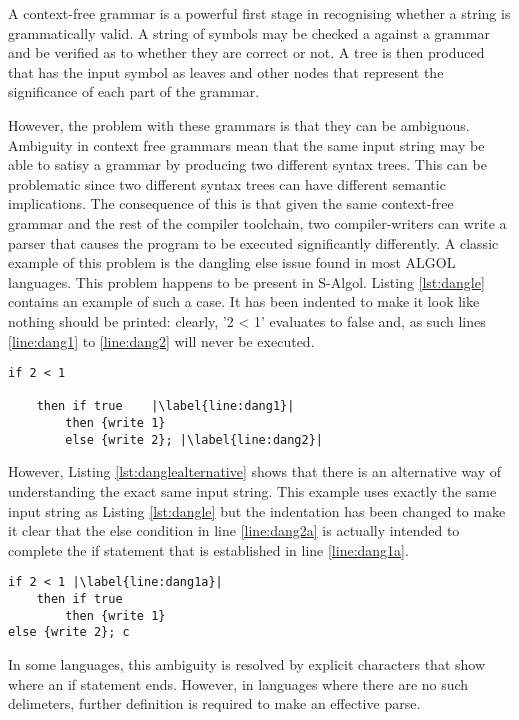 \documentclass{article}
\begin{document}
A context-free grammar is a powerful first stage in recognising whether a string is grammatically valid. A string of symbols may be checked a against a grammar and be verified as to whether they are correct or not. A tree is then produced that has the input symbol as leaves and other nodes that represent the significance of each part of the grammar.

However, the problem with these grammars is that they can be ambiguous. Ambiguity in context free grammars mean that the same input string may be able to satisy a grammar by producing two different syntax trees. This can be problematic since two different syntax trees can have different semantic implications. The consequence of this is that given the same context-free grammar and the rest of the compiler toolchain, two compiler-writers can write a parser that causes the program to be executed significantly differently. A classic example of this problem is the dangling else issue found in most ALGOL languages. This problem happens to be present in S-Algol. Listing \ref{lst:dangle} contains an example of such a case. It has been indented to make it look like nothing should be printed: clearly, '2 < 1' evaluates to false and, as such lines \ref{line:dang1} to \ref{line:dang2} will never be executed.

\begin{lstlisting}[caption={S-Algol dangling else},label={lst:dangle}, escapechar="|"]
if 2 < 1

	then if true	|\label{line:dang1}|
		then {write 1}
		else {write 2}; |\label{line:dang2}|
\end{lstlisting}

However, Listing \ref{lst:danglealternative} shows that there is an alternative way of understanding the exact same input string. This example uses exactly the same input string as Listing \ref{lst:dangle} but the indentation has been changed to make it clear that the else condition in line \ref{line:dang2a} is actually intended to complete the if statement that is established in line \ref{line:dang1a}.

\begin{lstlisting}[caption={S-Algol dangling else alternative parse},label={lst:danglealternative}, escapechar="|"]
if 2 < 1 |\label{line:dang1a}|
	then if true 
		then {write 1}
else {write 2}; c
\end{lstlisting}

In some languages, this ambiguity is resolved by explicit characters that show where an if statement ends. However, in languages where there are no such delimeters, further definition is required to make an effective parse.
\end{document}
